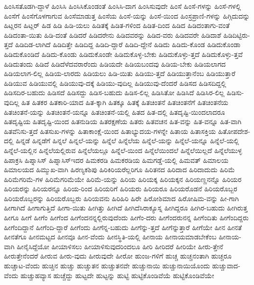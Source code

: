 {ಹಿಂಸಿಸತೊಡಗಿ-ದ್ದಾಳೆ
ಹಿಂಸಿಸಿ
ಹಿಂಸಿಸಿಕೊಂಡಂತೆ
ಹಿಂಸಿಸಿ-ದಾಗ
ಹಿಂಸಿಸುವುದೇ
ಹಿಂಸೆ
ಹಿಂಸೆ-ಗಳನ್ನು
ಹಿಂಸೆ-ಗಳಲ್ಲಿ
ಹಿಂಸೆಗೆ
ಹಿಂಸೆಗೊಳಗಾಗುವ
ಹಿಂಸೆಮಾಡುತ್ತ
ಹಿಂಸೆಯ
ಹಿಂಸೆ-ಯನ್ನು
ಹಿಂಸೆ-ಯಿಂದ
ಹಿಂಸ್ರಪ್ರಾಣಿ-ಗಳನ್ನು
ಹಿಗ್ಗಿದುದನ್ನು
ಹಿಟ್ಲರನ
ಹಿಟ್ಲರ್
ಹಿಡ
ಹಿಡಿ
ಹಿಡಿ-ಯಲು
ಹಿಡಿತಕ್ಕೆ
ಹಿಡಿತ-ಗಳಿಂದ
ಹಿಡಿತ-ದಿಂದ
ಹಿಡಿದ
ಹಿಡಿದಂತಾಗು-ವಂತೆ
ಹಿಡಿದಂತಾ-ಯಿತು
ಹಿಡಿ-ದಂತೆ
ಹಿಡಿದರೆ
ಹಿಡಿದರೇನು
ಹಿಡಿದವರನ್ನು
ಹಿಡಿದ-ವರು
ಹಿಡಿದವರೇ
ಹಿಡಿದಾಶೆ
ಹಿಡಿದಿಟ್ಟಿರು-ತ್ತದೆ
ಹಿಡಿದಿಡ-ಲಾಗಿದೆ
ಹಿಡಿದಿತ್ತೇ
ಹಿಡಿದಿದ್ದ
ಹಿಡಿದಿ-ದ್ದಾರೆ
ಹಿಡಿದಿ-ದ್ದೇನೆ
ಹಿಡಿದು
ಹಿಡಿದು-ಕೊಂಡ
ಹಿಡಿದುಕೊಂಡಾ
ಹಿಡಿದುಕೊಂಡಿದೆ
ಹಿಡಿದು-ಕೊಂಡು
ಹಿಡಿದುಕೊಂಡೇ
ಹಿಡಿದುಕೊಳ್ಳ-ಬೇಕು
ಹಿಡಿದುಕೊಳ್ಳು-ತ್ತದೆ
ಹಿಡಿದುಕೊಳ್ಳು-ತ್ತವೆ
ಹಿಡಿದುತಂದು
ಹಿಡಿದೆ
ಹಿಡಿದೆಳೆದವರಾರೆಂದು
ಹಿಡಿಯದೇ
ಹಿಡಿಯಬಂದವು
ಹಿಡಿಯ-ಬೇಕು
ಹಿಡಿಯಲಾಗದ
ಹಿಡಿಯಲಾಗ-ಲಿಲ್ಲ
ಹಿಡಿಯ-ಲಾರದು
ಹಿಡಿಯಲು
ಹಿಡಿ-ಯಿತು
ಹಿಡಿಯು-ತ್ತದೆ
ಹಿಡಿಯುತ್ತಾನೆಂಬ
ಹಿಡಿಯುತ್ತಾರೆ
ಹಿಡಿಯುವ
ಹಿಡಿಯುವಲ್ಲಿ
ಹಿಡಿಯುವು-ದಕ್ಕೆ
ಹಿಡಿಯು-ವುದಿಲ್ಲ
ಹಿಡಿಯುವು-ದೆಂದರೆ
ಹಿಡಿಸದ
ಹಿಡಿಸದಿದ್ದಲ್ಲಿ
ಹಿಡಿಸದಿರ-ಬಹುದು
ಹಿಡಿಸದೆ
ಹಿಡಿಸದ್ದು
ಹಿಡಿಸ-ಬಹುದು
ಹಿಡಿಸ-ಲಿಲ್ಲ
ಹಿಡಿಸಿತೋ
ಹಿಡಿಸಿದೆ
ಹಿಡಿಸಿರ-ಲಿಲ್ಲ
ಹಿಡಿಸು-ವುದಿಲ್ಲ
ಹಿತ
ಹಿತಕರ
ಹಿತಕಾರಿ-ಯಾದ
ಹಿತ-ಕ್ಕಾಗಿ
ಹಿತಕ್ಕೂ
ಹಿತಕ್ಕೆ
ಹಿತಚಿಂತನೆ
ಹಿತಚಿಂತನೆಗೆ
ಹಿತಚಿಂತನೆಯ
ಹಿತಚಿಂತನೆ-ಯನ್ನು
ಹಿತಚಿಂತನೆ-ಯನ್ನೂ
ಹಿತಚಿಂತನೆ-ಯಲ್ಲಿ
ಹಿತದ
ಹಿತ-ದಲ್ಲಿ
ಹಿತದೃಷ್ಟಿ-ಯಿಂದಲಾದರೂ
ಹಿತದೃಷ್ಟಿಯ
ಹಿತದೃಷ್ಟಿ-ಯಿಂದ
ಹಿತನುಡಿಯ
ಹಿತರಕ್ಷಣೆಯ
ಹಿತರು
ಹಿತವಚನ
ಹಿತ-ವನ್ನು
ಹಿತ-ವನ್ನೂ
ಹಿತ-ವಾಗಿ
ಹಿತವೆನಿಸು-ತ್ತದೆ
ಹಿತಸುಖ-ಗಳನ್ನು
ಹಿತಾಕಾಂಕ್ಷೆ-ಯಿಂದ
ಹಿತಾಭ್ಯುದಯ-ಗಳನ್ನೇ
ಹಿತಾಯ
ಹಿತಾಸಕ್ತಿಯ
ಹಿತೋಪದೇಶ-ದಲ್ಲಿ
ಹಿನ್ನಡೆ
ಹಿನ್ನಡೆಗೆ
ಹಿನ್ನಲೆ
ಹಿನ್ನಲೆ-ಯನ್ನು
ಹಿನ್ನೆಲೆ
ಹಿನ್ನೆಲೆಯ
ಹಿನ್ನೆಲೆ-ಯನ್ನು
ಹಿನ್ನೆಲೆ-ಯನ್ನೂ
ಹಿನ್ನೆಲೆ-ಯಲ್ಲಿ
ಹಿನ್ನೆಲೆ-ಯಲ್ಲಿನ
ಹಿನ್ನೆಲೆಯಲ್ಲಿರುವ
ಹಿನ್ನೆಲೆಯಲ್ಲೂ
ಹಿನ್ನೆಲೆ-ಯಿಂದ
ಹಿನ್ನೆಲೆಯಿಂದಲೆ
ಹಿನ್ನೆಲೆಯಿಲ್ಲದೆ
ಹಿನ್ನೆಲೆಯುಳ್ಳ
ಹಿಪಾಕ್ರಸಿ
ಹಿಪ್ನಾಸಿಸ್
ಹಿಪ್ನಾಸಿಸ್ಇದರ
ಹಿಮಕರಡಿ
ಹಿಮಕರಡಿಯ
ಹಿಮಗಡ್ಡೆ-ಯಲ್ಲಿ
ಹಿಮವತ್
ಹಿಮಾಲಯ
ಹಿಮಾಲಯದ
ಹಿಮ್ಮುಖ-ವಾಗಿ
ಹಿರಣ್ಯಕಶಿಪು
ಹಿರಿಕಿರಿಯರೆಲ್ಲರಿಗೂ
ಹಿರಿತನದ
ಹಿರಿದಾದ
ಹಿರಿದಾದುದು
ಹಿರಿಮೆ
ಹಿರಿಮೆಗರಿಮೆ-ಗಳ
ಹಿರಿಮೆಗರಿಮೆಯೇ
ಹಿರಿಮೆ-ಯನ್ನು
ಹಿರಿಯ
ಹಿರಿಯಕ್ಕ
ಹಿರಿಯಕ್ಕನ
ಹಿರಿಯಣ್ಣನನ್ನೊ
ಹಿರಿಯರ
ಹಿರಿಯರನ್ನು
ಹಿರಿಯರನ್ನೂ
ಹಿರಿಯ-ರಿಂದ
ಹಿರಿಯರಿಗೆ
ಹಿರಿಯರು
ಹಿರಿಯರೂ
ಹಿರಿಯರೊಡನೆ
ಹಿರಿಯರೊಬ್ಬರ
ಹಿರಿಯರೊಬ್ಬರನ್ನು
ಹಿರಿಯರೊಬ್ಬರು
ಹಿರಿಯವನು
ಹಿರಿಹಿರಿ
ಹಿರೇ
ಹಿರೋಶಿಮಾದ
ಹಿರೋಷಿಮ-ವನ್ನು
ಹೀ-ಗಾಗಿ
ಹೀಗಾಗಿದೆ
ಹೀಗಾಗುತ್ತಿದೆ
ಹೀಗಾ-ಯಿತು
ಹೀಗಿತ್ತು
ಹೀಗಿದೆ
ಹೀಗಿದೆಸಿರಾಕ್ಯೂಸ್ನ
ಹೀಗಿದ್ದರೂ
ಹೀಗಿರ-ಬಹುದು
ಹೀಗಿರುತ್ತ
ಹೀಗೂ
ಹೀಗೆ
ಹೀಗೆಂ
ಹೀಗೆಂದ
ಹೀಗೆಂದನನ್ನಲ್ಲಿರುವುದೆಂದು
ಹೀಗೆಂ-ದರು
ಹೀಗೆಂದರುನನ್ನ
ಹೀಗೆಂದಿತು
ಹೀಗೆಂದಿದ್ದರು
ಹೀಗೆಂದಿದ್ದಾನೆ
ಹೀಗೆಂದಿ-ದ್ದಾರೆ
ಹೀಗೆಂದು
ಹೀಗೆನ್ನ-ಬಹುದು
ಹೀಗೆನ್ನು-ತ್ತದೆ
ಹೀಗೆನ್ನುತ್ತಾರೆ
ಹೀಗೆಯೇ
ಹೀನ
ಹೀನತೆ
ಹೀನತೆಗೂ
ಹೀನಮಟ್ಟದ
ಹೀನವೂ
ಹೀನ-ವೆಂದು
ಹೀನಸ್ಥಿತಿ-ಯಲ್ಲಿ
ಹೀನಾಯ
ಹೀನಾಯಮಾಡಬೇಕೆಂಬ
ಹೀನಾಯ-ವಾಗಿ
ಹೀನೈಸಿದ್ದೆಯೋ
ಹೀಯಾಳಿಸಲು
ಹೀಯಾಳಿಸುವುದರಿಂದಲೂ
ಹೀರಿ
ಹೀರಿದರೆ
ಹೀರಿಯೇ
ಹೀರು-ತ್ತೇನೆ
ಹೀರುತ್ತೇನೆಂದರೆ
ಹೀರುವ
ಹೀರು-ವುದು
ಹೀರುವುದೇ
ಹೀರೋ
ಹುಂಜ-ಗಳಿಗೆ
ಹುಚ್ಚ
ಹುಚ್ಚನಂತಾಗಿ
ಹುಚ್ಚರೂ
ಹುಚ್ಚಾಟ-ವೆಂದು
ಹುಚ್ಚಿನ
ಹುಚ್ಚು
ಹುಚ್ಚುತನ
ಹುಚ್ಚುತನವೇ
ಹುಚ್ಚುನಾಯಿ
ಹುಚ್ಚುನಾಯಿಯೊಂದು
ಹುಚ್ಚುವಾದ-ವೆಂದು
ಹುಚ್ಚುಹವ್ಯಾಸ
ಹುಚ್ಚೆದ್ದು
ಹುಟ್ಟದೇ
ಹುಟ್ಟನ್ನು
ಹುಟ್ಟಿ
ಹುಟ್ಟಿಕೊಂಡಿವೆಯೆ
ಹುಟ್ಟಿಕೊಂಡಿವೆಯೇ
}
